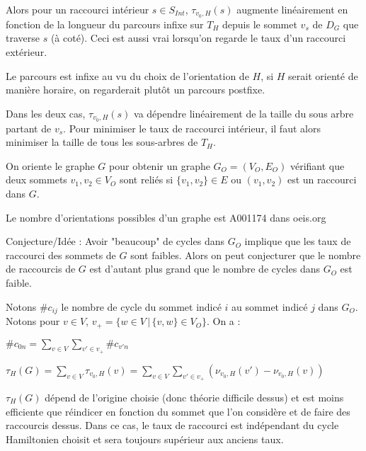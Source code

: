 \documentclass[french,a4paper]{article}
\begin{document}
Alors pour un raccourci intérieur $s \in S_{Int}$, $\tau_{v_0,H}(s)$ augmente linéairement en fonction de la longueur du parcours infixe sur $T_H$ depuis le sommet $v_s$ de $D_G$ que traverse $s$ (à coté).
Ceci est aussi vrai lorsqu'on regarde le taux d'un raccourci extérieur.

Le parcours est infixe au vu du choix de l'orientation de $H$, si $H$ serait orienté de manière horaire, on regarderait plutôt un parcours postfixe.

Dans les deux cas, $\tau_{v_0,H}(s)$ va dépendre linéairement de la taille du sous arbre partant de $v_s$. Pour minimiser le taux de raccourci intérieur, il faut alors minimiser la taille de tous les sous-arbres de $T_H$.

\bigskip



On oriente le graphe $G$ pour obtenir un graphe $G_{O}=(V_O,E_O)$ vérifiant que deux sommets $v_1,v_2 \in V_O$ sont reliés si $\{v_1,v_2\} \in E$ ou $(v_1,v_2)$ est un raccourci dans $G$.

Le nombre d'orientations possibles d'un graphe est A001174 dans oeis.org

\smallskip

Conjecture/Idée : Avoir "beaucoup" de cycles dans $G_O$ implique que les taux de raccourci des sommets de $G$ sont faibles. Alors on peut conjecturer que le nombre de raccourcis de $G$ est d'autant plus grand que le nombre de cycles dans $G_O$ est faible.

\smallskip

Notons $\#c_{ij}$ le nombre de cycle du sommet indicé $i$ au sommet indicé $j$ dans $G_O$. Notons pour $v \in V$, $v_{+} = \{w \in V \, | \, \{v,w\} \in V_{O}\}$. On a :

\medskip

$\#c_{0n}=\sum\limits_{v \in V} \sum\limits_{v' \in v_{+}} \#c_{v'n}$

\medskip

$\tau_{H}(G)=\sum\limits_{v \in V} \tau_{v_0,H}(v)=\sum\limits_{v \in V} \sum\limits_{v' \in v_{+}} (\nu_{v_0,H}(v')-\nu_{v_0,H}(v))$

\medskip

$\tau_H(G)$ dépend de l'origine choisie (donc théorie difficile dessus) et est moins efficiente que réindicer en fonction du sommet que l'on considère et de faire des raccourcis dessus. Dans ce cas, le taux de raccourci est indépendant du cycle Hamiltonien choisit et sera toujours supérieur aux anciens taux.
\end{document}
